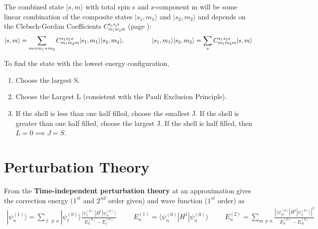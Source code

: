 The combined state $| s, m \rangle$  with total spin s and z-component m will be some linear combination of the composite states $| s_1, m_1 \rangle$ and $| s_2, m_2 \rangle$ and depends on the Clebsch-Gordan Coefficients $C_{m_1m_2m}^{s_1s_2s}$ (page \pageref{Clebsch-Gordan}):
\begin{align}
| s, m \rangle = \sum_{m=m_1+m_2} C_{m_1m_2m}^{s_1s_2s}| s_1, m_1 \rangle| s_2, m_2 \rangle, \hspace{1.5cm} | s_1, m_1 \rangle| s_2, m_2 \rangle = \sum_{s} C_{m_1m_2m}^{s_1s_2s}| s, m \rangle
\end{align}

\begin{fancybox}{}
To find the state with the lowest energy configuration,
	\begin{enumerate}
		\item Choose the largest S.
		\item Choose the Largest L (consistent with the Pauli Exclusion Principle).
		\item If the shell is less than one half filled, choose the smallest J. If the shell is greater than one half filled, choose the largest J. If the shell is half filled, then $L=0 \implies J=S$.
	\end{enumerate}
\end{fancybox}

\section{Perturbation Theory}
From the \textbf{Time-independent perturbation theory} at an approximation gives the correction energy ($1^{st}$ and $2^{nd}$ order given) and wave function ($1^{st}$ order) as
\begin{align}
	| \psi_n^{(1)} \rangle = \sum_{\ell \neq n} | \psi_\ell^{(0)} \rangle \frac{\langle \psi_\ell^{(0)}|H^1| \psi_n^{(0)} \rangle }{E_n^{(0)}-E_\ell^{(0)}} \hspace{1cm} E_n^{(1)}=\langle \psi_n^{(0)}|H^1| \psi_n^{(0)}\rangle  \hspace{1cm} E_n^{(2)} = \sum_{m \neq n} \frac{|\langle \psi_m^{(0)}|H^1| \psi_n^{(0)} \rangle|^2 }{E_n^{(0)}-E_m^{(0)}}  
\end{align}